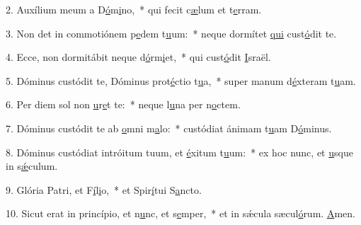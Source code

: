 2. Auxílium meum a D\uline{ó}m\uline{i}no,~* qui fecit c\uline{æ}lum et t\uline{e}rram.\par 
3. Non det in commotiónem p\uline{e}dem t\uline{u}um:~* neque dormítet \uline{qui} cust\uline{ó}dit te.\par 
4. Ecce, non dormitábit neque d\uline{ó}rm\uline{i}et,~* qui cust\uline{ó}dit \uline{I}sraël.\par 
5. Dóminus custódit te, Dóminus prot\uline{é}ctio t\uline{u}a,~* super manum d\uline{é}xteram t\uline{u}am.\par 
6. Per diem sol non \uline{u}r\uline{e}t te:~* neque l\uline{u}na per n\uline{o}ctem.\par 
7. Dóminus custódit te ab \uline{o}mni m\uline{a}lo:~* custódiat ánimam t\uline{u}am D\uline{ó}minus.\par 
8. Dóminus custódiat intróitum tuum, et \uline{é}xitum t\uline{u}um:~* ex hoc nunc, et \uline{u}sque in s\uline{ǽ}culum.\par 
9. Glória Patri, et F\uline{í}l\uline{i}o,~* et Spir\uline{í}tui S\uline{a}ncto.\par 
10. Sicut erat in princípio, et n\uline{u}nc, et s\uline{e}mper,~* et in sǽcula sæcul\uline{ó}rum. \uline{A}men.\par 
